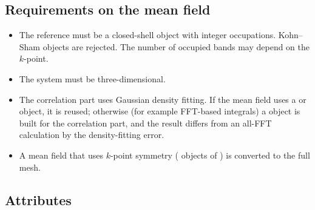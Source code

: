 \subsection{Requirements on the mean field}

\begin{itemize}
  \item The reference must be a closed-shell  object with integer
        occupations. Kohn--Sham objects are rejected. The number of
        occupied bands may depend on the $k$-point.
  \item The system must be three-dimensional.
  \item The correlation part uses Gaussian density fitting. If the mean field
        uses a  or  object, it is reused; otherwise
        (for example FFT-based integrals) a  object is built for
        the correlation part, and the result differs from an all-FFT
        calculation by the density-fitting error.
  \item A mean field that uses $k$-point symmetry ( objects of
        \pyscf{}) is converted to the full mesh.
\end{itemize}

\subsection{Attributes}

